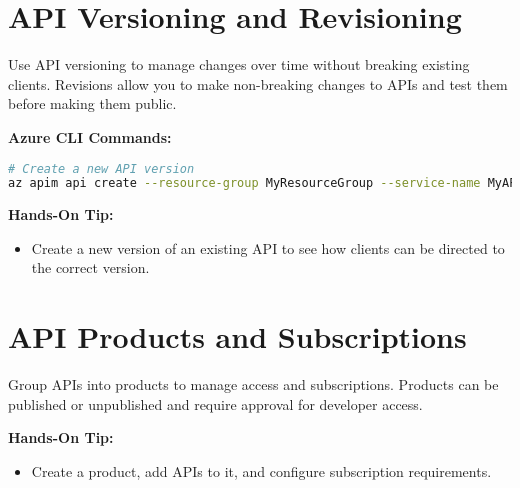 \documentclass{article}
\begin{document}
\section{API Versioning and Revisioning}
Use API versioning to manage changes over time without breaking existing clients. Revisions allow you to make non-breaking changes to APIs and test them before making them public.

\textbf{Azure CLI Commands:}
\begin{lstlisting}[language=bash]
# Create a new API version
az apim api create --resource-group MyResourceGroup --service-name MyAPIMService --path v2/myapi --api-id myapi-v2 --display-name "My API v2" --service-url https://myapi.example.com/v2
\end{lstlisting}

\textbf{Hands-On Tip:}
\begin{itemize}
    \item Create a new version of an existing API to see how clients can be directed to the correct version.
\end{itemize}

\section{API Products and Subscriptions}
Group APIs into products to manage access and subscriptions. Products can be published or unpublished and require approval for developer access.

\textbf{Hands-On Tip:}
\begin{itemize}
    \item Create a product, add APIs to it, and configure subscription requirements.
\end{itemize}
\end{document}
